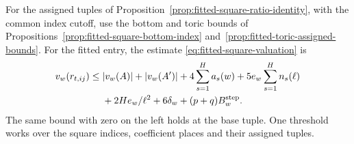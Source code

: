 \begin{proposition}\label{prop:fitted-square-valuation}
For the assigned tuples of Proposition~\ref{prop:fitted-square-ratio-identity},
with the common index cutoff, use the bottom and toric bounds of
Propositions~\ref{prop:fitted-square-bottom-index}
and~\ref{prop:fitted-toric-assigned-bounds}. For the fitted entry, the estimate \eqref{eq:fitted-square-valuation} is
\[
 \begin{aligned}v_w(r_{t,ij})\le{}&|v_w(A)|+|v_w(A')|+4\sum_{s=1}^{H}a_s(w)+5e_w\sum_{s=1}^{H}n_s(\ell)\\&+2He_w/\ell^2+6\delta_w+(p+q)B_w^{\rm step}.\end{aligned}
\]
 The same bound with zero
on the left holds at the base tuple. One threshold works over
the square indices, coefficient places and their assigned tuples.
\end{proposition}


